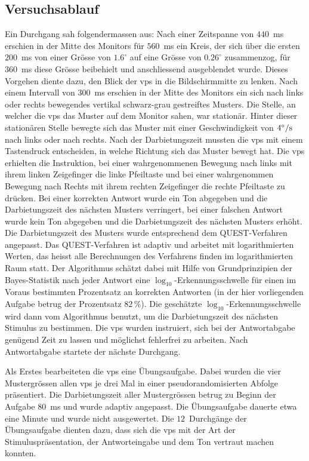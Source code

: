 \documentclass[11pt, twoside, a4paper]{book}		%
\begin{document}
\subsection{Versuchsablauf \label{subsec:Spatial-Suppression_Versuchsablauf}}

Ein Durchgang sah folgendermassen aus: Nach einer Zeitspanne von $440$~ms erschien in der Mitte des Monitors für $560$~ms ein Kreis, der sich über die ersten $200$~ms von einer Grösse von $1.6^{\circ}$ auf eine Grösse von $0.26^{\circ}$ zusammenzog, für $360$~ms diese Grösse beibehielt und anschliessend ausgeblendet wurde. Dieses Vorgehen diente dazu, den Blick der \glspl{vp} in die Bildschirmmitte zu lenken. Nach einem  Intervall von $300$~ms erschien in der Mitte des Monitors ein sich nach links oder rechts bewegendes vertikal schwarz-grau gestreiftes Musters. Die Stelle, an welcher die \glspl{vp} das Muster auf dem Monitor sahen, war stationär. Hinter dieser stationären Stelle bewegte sich das Muster mit einer Geschwindigkeit von $4^\circ / \textnormal{s} $  nach links oder nach rechts. Nach der Darbietungszeit mussten die \glspl{vp} mit einem Tastendruck entscheiden, in welche Richtung sich das Muster bewegt hat. Die \glspl{vp} erhielten die Instruktion, bei einer wahrgenommenen Bewegung nach links mit ihrem linken Zeigefinger die linke Pfeiltaste  und bei einer wahrgenommen Bewegung nach Rechts mit ihrem rechten Zeigefinger die rechte Pfeiltaste zu drücken. 
Bei einer korrekten Antwort wurde ein Ton abgegeben und die Darbietungszeit des nächsten Musters verringert, bei einer falschen Antwort wurde kein Ton abgegeben und die Darbietungszeit des nächsten Musters erhöht. 
Die Darbietungszeit des Musters wurde entsprechend dem QUEST-Ver\-fah\-ren \citep{Watson1983} angepasst.
Das QUEST-Ver\-fah\-ren ist adaptiv und arbeitet mit logarithmierten Werten, das heisst alle Berechnungen des Verfahrens finden im logarithmierten Raum statt. Der Algorithmus schätzt dabei mit Hilfe von Grundprinzipien der Bayes-Statistik nach jeder Antwort eine $\log_{10}$-Erkennungsschwelle für einen im Voraus bestimmten Prozentsatz an korrekten Antworten (in der hier vorliegenden Aufgabe betrug der Prozentsatz $82\,\%$).
Die geschätzte $\log_{10}$-Erkennungsschwelle wird dann vom Algorithmus benutzt, um die Darbietungszeit des nächsten Stimulus zu bestimmen. 
Die \glspl{vp} wurden instruiert, sich bei der Antwortabgabe genügend Zeit zu lassen und möglichst fehlerfrei zu arbeiten. Nach Antwortabgabe startete der nächste Durchgang.

Als Erstes bearbeiteten die \glspl{vp} eine Übungsaufgabe. Dabei wurden die vier Mustergrössen allen \glspl{vp} je drei Mal in einer pseudorandomisierten Abfolge präsentiert. Die Darbietungszeit aller Mustergrössen betrug zu Beginn der Aufgabe $80$~ms und wurde adaptiv angepasst. Die Übungsaufgabe dauerte etwa eine Minute und wurde nicht ausgewertet. Die $12$~Durchgänge der Übungsaufgabe dienten dazu, dass sich die \glspl{vp} mit der Art der Stimuluspräsentation, der Antworteingabe und dem Ton vertraut machen konnten. 
\end{document}
